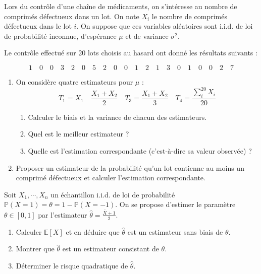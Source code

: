\smallskip

\begin{mdframed}
\begin{exercice}
Lors du contrôle d’une chaîne de médicaments, on s’intéresse au nombre de comprimés défectueux dans un lot. On note $X_i$ le nombre de comprimés défectueux dans le lot $i$. On suppose que ces variables aléatoires sont i.i.d. de loi de probabilité inconnue, d’espérance $\mu$ et de variance $\sigma^2$.

Le contrôle effectué sur 20 lots choisis au hasard ont donné les résultats suivants :

$$
1\quad 0 \quad 0 \quad 3 \quad 2 \quad 0 \quad 5 \quad 2 \quad 0 \quad 0 \quad 1 \quad 2 \quad 1 \quad 3 \quad 0 \quad 1 \quad 0 \quad 0 \quad 2 \quad 7
$$

\begin{enumerate}
    \item On considère quatre estimateurs pour $\mu$ :
    $$
    T_1 = X_1 \quad \frac{X_1 + X_2}{2} \quad T_3 = \frac{X_1 + X_2}{3} \quad T_4 = \frac{\sum_i^{20} X_i}{20}
    $$
    \begin{enumerate}
        \item[(a)] Calculer le biais et la variance de chacun des estimateurs.
        \item[(b)] Quel est le meilleur estimateur ?
        \item[(c)] Quelle est l’estimation correspondante (c’est-à-dire sa valeur observée) ?
    \end{enumerate}
    \item Proposer un estimateur de la probabilité qu’un lot contienne au moins un comprimé défectueux et calculer
l’estimation correspondante.
\end{enumerate}
\end{exercice}
\end{mdframed}

\smallskip

\begin{mdframed}
\begin{exercice}
Soit $X_1, \cdots , X_n$ un échantillon i.i.d. de loi de probabilité $\mathbb{P}(X = 1) = \theta = 1 - \mathbb{P}(X = -1)$. On se propose d’estimer le paramètre $\theta \in [0 , 1]$ par l’estimateur $\hat{\theta} = \frac{\bar{X} + 1}{2}$.

\begin{enumerate}
    \item Calculer $\mathbb{E}[X]$ et en déduire que $\hat{\theta}$ est un estimateur sans biais de $\theta$.
    \item Montrer que $\hat{\theta}$ est un estimateur consistant de $\theta$.
    \item Déterminer le risque quadratique de $\hat{\theta}$.
\end{enumerate}
\end{exercice}
\end{mdframed}

